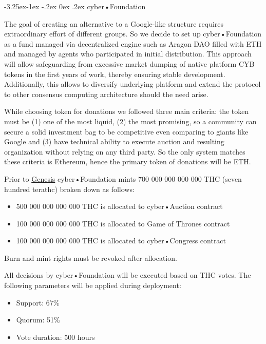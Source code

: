 \documentclass[8pt,oneside]{amsart}
\makeatletter
\renewcommand\subsection{\@startsection{subsection}{2}{\z@}%
                                     {-3.25ex\@plus -1ex \@minus -.2ex}%
                                     {0ex \@plus .2ex}%
                                     {\play\Large}}%
\newcommand{\titleSection}[1]{\subsection{#1}}
\newenvironment{Figure}
  {\par\medskip\noindent\minipage{\linewidth}}
  {\endminipage\par\medskip}
\makeatother
\begin{document}
\titleSection{cyber•Foundation}\label{joint-goal}

The goal of creating an alternative to a Google-like structure requires extraordinary effort of different groups. So we decide to set up cyber•Foundation as a fund managed via decentralized engine such as Aragon DAO filled with ETH and managed by agents who participated in initial distribution. This approach will allow safeguarding from excessive market dumping of native platform CYB tokens in the first years of work, thereby ensuring stable development. Additionally, this allows to diversify underlying platform and extend the protocol to other consensus computing architecture should the need arise.

While choosing token for donations we followed three main criteria: the token must be (1) one of the most liquid, (2) the most promising, so a community can secure a solid investment bag to be competitive even comparing to giants like Google and (3) have technical ability to execute auction and resulting organization without relying on any third party. So the only system matches these criteria is Ethereum, hence the primary token of donations will be ETH.

Prior to \hyperlink{genesis}{Genesis} cyber•Foundation mints 700 000 000 000 000 THC (seven hundred terathc) broken down as follows:

\begin{itemize}
\item 500 000 000 000 000 THC is allocated to cyber•Auction contract
\item 100 000 000 000 000 THC is allocated to Game of Thrones contract
\item 100 000 000 000 000 THC is allocated to cyber•Congress contract
\end{itemize}

\begin{Figure}
 \centering
 
\end{Figure}

Burn and mint rights must be revoked after allocation.

All decisions by cyber•Foundation will be executed based on THC votes. The following parameters will be applied during deployment:

\begin{itemize}
\item Support: 67\%
\item Quorum: 51\%
\item Vote duration: 500 hours
\end{itemize}
\end{document}
